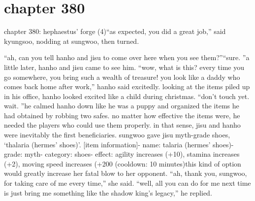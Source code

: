 \section{chapter 380}

chapter 380: hephaestus’ forge (4)“as expected, you did a great job,” said kyungsoo, nodding at sungwoo, then turned.





“ah, can you tell hanho and jisu to come over here when you see them?”“sure.
”a little later, hanho and jisu came to see him.
“wow, what is this? every time you go somewhere, you bring such a wealth of treasure! you look like a daddy who comes back home after work,” hanho said excitedly.
looking at the items piled up in his office, hanho looked excited like a child during christmas.
“don’t touch yet.
 wait.
”he calmed hanho down like he was a puppy and organized the items he had obtained by robbing two safes.
 no matter how effective the items were, he needed the players who could use them properly.
 in that sense, jisu and hanho were inevitably the first beneficiaries.
sungwoo gave jisu myth-grade shoes, ‘thalaria (hermes’ shoes)’.
[item information]- name: talaria (hermes’ shoes)- grade: myth- category: shoes- effect: agility increases (+10), stamina increases (+2), moving speed increases (+200%
 (cooldown: 10 minutes)this kind of option would greatly increase her fatal blow to her opponent.
“ah, thank you, sungwoo, for taking care of me every time,” she said.
“well, all you can do for me next time is just bring me something like the shadow king’s legacy,” he replied.

